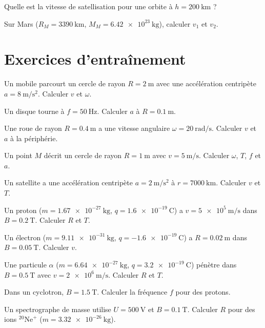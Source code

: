 \exo{} Quelle est la vitesse de satellisation pour une orbite à $h=\SI{200}{\kilo\metre}$ ?

\exo{} Sur Mars ($R_M=\SI{3390}{\kilo\metre}$, $M_M=\SI{6.42e23}{\kilogram}$), calculer $v_1$ et $v_2$.

\section{Exercices d'entraînement}


\exo{} Un mobile parcourt un cercle de rayon $R=\SI{2}{\metre}$ avec une accélération centripète $a=\SI{8}{\metre\per\second\squared}$. Calculer $v$ et $\omega$.

\exo{} Un disque tourne à $f=\SI{50}{\hertz}$. Calculer $a$ à $R=\SI{0.1}{\metre}$.

\exo{} Une roue de rayon $R=\SI{0.4}{\metre}$ a une vitesse angulaire $\omega=\SI{20}{\radian\per\second}$. Calculer $v$ et $a$ à la périphérie.

\exo{} Un point $M$ décrit un cercle de rayon $R=\SI{1}{\metre}$ avec $v=\SI{5}{\metre\per\second}$. Calculer $\omega$, $T$, $f$ et $a$.

\exo{} Un satellite a une accélération centripète $a=\SI{2}{\metre\per\second\squared}$ à $r=\SI{7000}{\kilo\metre}$. Calculer $v$ et $T$.


\exo{} Un proton ($m=\SI{1.67e-27}{\kilogram}$, $q=\SI{1.6e-19}{\coulomb}$) a $v=\SI{5e5}{\metre\per\second}$ dans $B=\SI{0.2}{\tesla}$. Calculer $R$ et $T$.

\exo{} Un électron ($m=\SI{9.11e-31}{\kilogram}$, $q=\SI{-1.6e-19}{\coulomb}$) a $R=\SI{0.02}{\metre}$ dans $B=\SI{0.05}{\tesla}$. Calculer $v$.

\exo{} Une particule $\alpha$ ($m=\SI{6.64e-27}{\kilogram}$, $q=\SI{3.2e-19}{\coulomb}$) pénètre dans $B=\SI{0.5}{\tesla}$ avec $v=\SI{2e6}{\metre\per\second}$. Calculer $R$ et $T$.

\exo{} Dans un cyclotron, $B=\SI{1.5}{\tesla}$. Calculer la fréquence $f$ pour des protons.

\exo{} Un spectrographe de masse utilise $U=\SI{500}{\volt}$ et $B=\SI{0.1}{\tesla}$. Calculer $R$ pour des ions $^{20}\mathrm{Ne}^+$ ($m=\SI{3.32e-26}{\kilogram}$).


